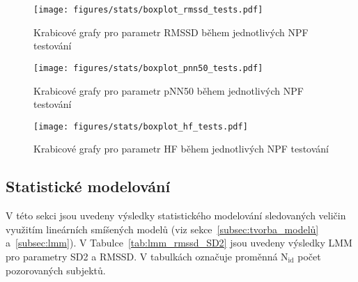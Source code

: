 \begin{figure}[H]
    \begin{center}
        \texttt{[image: figures/stats/boxplot\_rmssd\_tests.pdf]}
        \caption{Krabicové grafy pro parametr RMSSD během jednotlivých NPF testování}
        \label{fig:results_boxplot_rmssd_tests}
    \end{center}
    \vspace{-12mm}
\end{figure}
\begin{figure}[H]
    \begin{center}
        \texttt{[image: figures/stats/boxplot\_pnn50\_tests.pdf]}
        \caption{Krabicové grafy pro parametr pNN50 během jednotlivých NPF testování}
        \label{fig:results_boxplot_pnn50_tests}
    \end{center}
    \vspace{-12mm}
\end{figure}
\begin{figure}[H]
    \begin{center}
        \texttt{[image: figures/stats/boxplot\_hf\_tests.pdf]}
        \caption{Krabicové grafy pro parametr HF během jednotlivých NPF testování}
        \label{fig:results_boxplot_hf_tests}
    \end{center}
    \vspace{-20mm}
\end{figure}

\subsection{Statistické modelování}
\label{sec:vysledky_lmm}
V této sekci jsou uvedeny výsledky statistického modelování sledovaných veličin
využitím lineárních smíšených modelů (viz sekce~\ref{subsec:tvorba_modelů}
a~\ref{subsec:lmm}). V Tabulce~\ref{tab:lmm_rmssd_SD2} jsou uvedeny výsledky
\gls{LMM} pro parametry SD2 a RMSSD. V tabulkách označuje proměnná
$\mathrm{N}_{\text{id}}$ počet pozorovaných subjektů.

